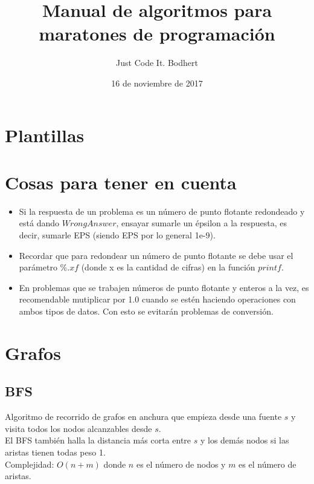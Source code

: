 \documentclass[10pt,letterpaper,twocolumn]{article}
\newcommand{\source}[1]{
  
  \dotfill
}
\begin{document}
\title{Manual de algoritmos para maratones de programación}
\author{Just Code It. Bodhert}
\date{16 de noviembre de 2017}
\maketitle

\tableofcontents

\section{Plantillas}
  \source{./src/template.cpp}
  \source{./src/template2.cpp}
 \section{Cosas para tener en cuenta}
  \begin{itemize}
    \item Si la respuesta de un problema es un número de punto flotante redondeado y está dando $Wrong Answer$, ensayar
             sumarle un épsilon a la respuesta, es decir, sumarle EPS (siendo EPS por lo general 1e-9).
    \item Recordar que para redondear un número de punto flotante se debe usar el parámetro $\%.xf$ (donde x es la cantidad de cifras)
             en la función $printf$.
    \item En problemas que se trabajen números de punto flotante y enteros a la vez, es recomendable mutiplicar por 1.0 cuando
             se estén haciendo operaciones con ambos tipos de datos. Con esto se evitarán problemas de conversión.
  \end{itemize}

\section{Grafos}

  \subsection{BFS}
    Algoritmo de recorrido de grafos en anchura que empieza desde una fuente $s$ y visita todos los nodos alcanzables desde $s$.\\
    El BFS también halla la distancia más corta entre $s$ y los demás nodos si las aristas tienen todas peso 1.\\
    Complejidad: $O(n+m)$ donde $n$ es el número de nodos y $m$ es el número de aristas.\\
    \source{./src/bfs.cpp}
\end{document}
